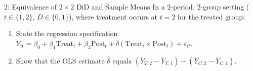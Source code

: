 \documentclass[12pt, a4paper]{article}
\newif\ifsolutions
\begin{document}
\begin{problembox}[50 Points]{2: Equivalence of $2 \times 2$ DiD and Sample Means}
In a $2$-period, $2$-group setting ($t \in \{1, 2\}$, $D \in \{0, 1\}$), where treatment occurs at $t=2$ for the treated group:
\begin{enumerate}[label=(\alph*)]
    \item State the regression specification $Y_{it} = \beta_0 + \beta_1 \mathrm{Treat}_i + \beta_2 \mathrm{Post}_t + \delta (\mathrm{Treat}_i \times \mathrm{Post}_t) + \varepsilon_{it}$.
    \item Show that the OLS estimate $\hat{\delta}$ equals $(\bar{Y}_{T,2} - \bar{Y}_{T,1}) - (\bar{Y}_{C,2} - \bar{Y}_{C,1})$.
\end{enumerate}
\end{problembox}

\ifsolutions
\begin{solutionbox}
Evaluating the conditional expectations of $Y$ for the four cells:
\begin{align*}
    \mathbb{E}[Y \mid \mathrm{Treat}=0, \mathrm{Post}=0] &= \beta_0 = \bar{Y}_{C,1} \\
    \mathbb{E}[Y \mid \mathrm{Treat}=0, \mathrm{Post}=1] &= \beta_0 + \beta_2 = \bar{Y}_{C,2} \implies \beta_2 = \bar{Y}_{C,2} - \bar{Y}_{C,1} \\
    \mathbb{E}[Y \mid \mathrm{Treat}=1, \mathrm{Post}=0] &= \beta_0 + \beta_1 = \bar{Y}_{T,1} \implies \beta_1 = \bar{Y}_{T,1} - \bar{Y}_{C,1} \\
    \mathbb{E}[Y \mid \mathrm{Treat}=1, \mathrm{Post}=1] &= \beta_0 + \beta_1 + \beta_2 + \delta = \bar{Y}_{T,2}
\end{align*}
Solving for $\delta$:
\begin{equation*}
    \delta = \bar{Y}_{T,2} - (\beta_0 + \beta_1 + \beta_2) = (\bar{Y}_{T,2} - \bar{Y}_{T,1}) - (\bar{Y}_{C,2} - \bar{Y}_{C,1}) \quad \blacksquare
\end{equation*}
\end{solutionbox}
\fi
\end{document}
